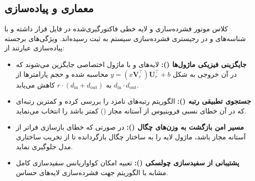\subsection{معماری و پیاده‌سازی}
کلاس موتور فشرده‌سازی  و لایه خطی فاکتورگیری‌شده  در فایل  قرار داشته و با شناسه‌های  و  در رجیستری فشرده‌سازی سیستم به ثبت رسیده‌اند. ویژگی‌های برجسته پیاده‌سازی عبارتند از:
\begin{itemize}
    \item \textbf{جایگزینی فیزیکی ماژول‌ها ():} لایه‌های  و  با ماژول اختصاصی  جایگزین می‌شوند که در آن خروجی به شکل $y = (x \mathbf{V}_r^\top)\mathbf{U}_r^\top + b$ محاسبه شده و حجم پارامترها از $d_{\text{in}} \cdot d_{\text{out}}$ به $r \cdot (d_{\text{in}} + d_{\text{out}})$ کاهش می‌یابد.
    \item \textbf{جستجوی تطبیقی رتبه ():} الگوریتم رتبه‌های نامزد را بررسی کرده و کمترین رتبه‌ای که در آن خطای نسبی فروبنیوس از آستانه مجاز () کمتر باشد را انتخاب می‌نماید.
    \item \textbf{مسیر امن بازگشت به وزن‌های چگال ():} در صورتی که خطای بازسازی فراتر از آستانه مجاز باشد، ماژول لایه را به ساختار چگال بازگردانده تا از تخریب ساختاری مدل جلوگیری نماید.
    \item \textbf{پشتیبانی از سفیدسازی چولسکی ():} تعبیه امکان کواواریانس سفیدسازی کامل مشابه با الگوریتم  جهت فشرده‌سازی لایه‌های حساس.
\end{itemize}

